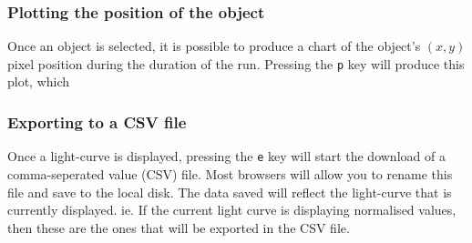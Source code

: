\subsubsection{Plotting the position of the object}
Once an object is selected, it is possible to produce a chart of the object's $(x, y)$ pixel position during the duration of the run. Pressing the \texttt{p} key will produce this plot, which 

\subsubsection{Exporting to a CSV file}
Once a light-curve is displayed, pressing the \texttt{e} key will start the download of a comma-seperated value (CSV) file. Most browsers will allow you to rename this file and save to the local disk. The data saved will reflect the light-curve that is currently displayed. ie. If the current light curve is displaying normalised values, then these are the ones that will be exported in the CSV file.

